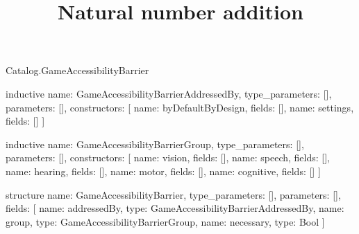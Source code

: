 \begin{lexlean}{Catalog.GameAccessibilityBarrier}
\title{Natural number addition}
\begin{semanticmodule}
inductive{
  name: GameAccessibilityBarrierAddressedBy,
  type_parameters: [],
  parameters: [],
  constructors: [
    {name: byDefaultByDesign, fields: []},
    {name: settings, fields: []}
  ]
}

inductive{
  name: GameAccessibilityBarrierGroup,
  type_parameters: [],
  parameters: [],
  constructors: [
    {name: vision, fields: []},
    {name: speech, fields: []},
    {name: hearing, fields: []},
    {name: motor, fields: []},
    {name: cognitive, fields: []}
  ]
}

structure{
  name: GameAccessibilityBarrier,
  type_parameters: [],
  parameters: [],
  fields: [
    {name: addressedBy, type: GameAccessibilityBarrierAddressedBy},
    {name: group, type: GameAccessibilityBarrierGroup},
    {name: necessary, type: Bool}
  ]
}
\end{semanticmodule}
\end{lexlean}
